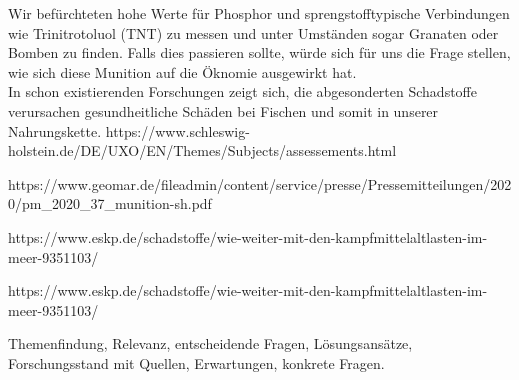 Wir befürchteten hohe Werte für Phosphor und sprengstofftypische Verbindungen wie Trinitrotoluol (TNT) 
zu messen und unter Umständen sogar Granaten oder Bomben zu finden. Falls dies passieren sollte, würde 
sich für uns die Frage stellen, wie sich diese Munition auf die Öknomie ausgewirkt hat. \\

In schon existierenden Forschungen zeigt sich, die abgesonderten Schadstoffe verursachen gesundheitliche Schäden bei Fischen und somit in unserer Nahrungskette. 
https://www.schleswig-holstein.de/DE/UXO/EN/Themes/Subjects/assessements.html

https://www.geomar.de/fileadmin/content/service/presse/Pressemitteilungen/2020/pm_2020_37_munition-sh.pdf

https://www.eskp.de/schadstoffe/wie-weiter-mit-den-kampfmittelaltlasten-im-meer-9351103/

https://www.eskp.de/schadstoffe/wie-weiter-mit-den-kampfmittelaltlasten-im-meer-9351103/

Themenfindung, Relevanz, entscheidende Fragen, Lösungsansätze, Forschungsstand mit Quellen, Erwartungen, konkrete Fragen.
